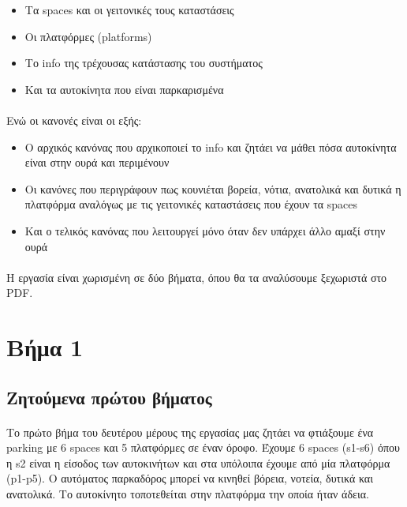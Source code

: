 \documentclass{article}
\begin{document}
    \begin{itemize}
        \item Τα spaces και οι γειτονικές τους καταστάσεις
        \item Οι πλατφόρμες (platforms)
        \item Το info της τρέχουσας κατάστασης του συστήματος
        \item Και τα αυτοκίνητα που είναι παρκαρισμένα
    \end{itemize}

    \paragraph{}
    Ενώ οι κανονές είναι οι εξής:

    \begin{itemize}
        \item O αρχικός κανόνας που αρχικοποιεί το info και ζητάει να μάθει πόσα αυτοκίνητα είναι στην ουρά και περιμένουν
        \item Οι κανόνες που περιγράφουν πως κουνιέται βορεία, νότια, ανατολικά και δυτικά η πλατφόρμα αναλόγως με τις γειτονικές
            καταστάσεις που έχουν τα spaces
        \item Και ο τελικός κανόνας που λειτουργεί μόνο όταν δεν υπάρχει άλλο αμαξί στην ουρά
    \end{itemize}

    \paragraph{}
    Η εργασία είναι χωρισμένη σε δύο βήματα, όπου θα τα αναλύσουμε ξεχωριστά στο PDF.

    \newpage
    \section{Βήμα 1}
    \subsection{Ζητούμενα πρώτου βήματος}
    \paragraph{}
    Το πρώτο βήμα του δευτέρου μέρους της εργασίας μας ζητάει να φτιάξουμε ένα parking με 6 spaces και 5 πλατφόρμες σε έναν όροφο.
    Έχουμε 6 spaces (s1-s6) όπου η s2 είναι η είσοδος των αυτοκινήτων και στα υπόλοιπα έχουμε από μία πλατφόρμα (p1-p5). 
    Ο αυτόματος παρκαδόρος μπορεί να κινηθεί βόρεια, νοτεία, δυτικά και ανατολικά. Το αυτοκίνητο τοποτεθείται στην πλατφόρμα
    την οποία ήταν άδεια.
\end{document}
